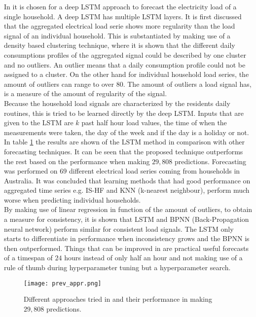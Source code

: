 In \cite{Kong2019} it is chosen for a deep LSTM approach to forecast the electricity load of a single household. A deep LSTM has multiple LSTM layers. It is first discussed that the aggregated electrical load serie shows more regularity than the load signal of an individual household.  This is substantiated by making use of a density based clustering technique, where it is shown that the different daily consumptions profiles of the aggregated signal could be described by one cluster and no outliers. An outlier means that a daily consumption profile could not be assigned to a cluster. On the other hand for individual household load series, the amount of outliers can range to over $ 80 $. The amount of outliers a load signal has, is a measure of the amount of regularity of the signal.\\
Because the household load signals are characterized by the residents daily routines, this is tried to be learned directly by the deep LSTM.
Inputs that are given to the LSTM are $ k $ past half hour load values, the time of when the measurements were taken, the day of the week and if the day is a holiday or not. In table \ref{tab:LSTM_lit_result} the results are shown of the LSTM method in comparison with other forecasting techniques. It can be seen that the proposed technique outperforms the rest based on the performance when making $ 29,808 $ predictions. Forecasting was performed on $ 69 $ different electrical load series coming from households in Australia. It was concluded that learning methods that had good performance on aggregated time series e.g. IS-HF and KNN (k-nearest neighbour), perform much worse when predicting individual households. \\
By making use of linear regression in function of the amount of outliers, to obtain a measure for consistency, it is shown that LSTM and BPNN (Back-Propagation neural network) perform similar for consistent load signals. The LSTM only starts to differentiate in performance when inconsistency grows and the BPNN is then outperformed. Things that can be improved in \cite{Kong2019} are practical useful forecasts of a timespan of $ 24 $ hours instead of only half an hour and not making use of a rule of thumb during hyperparameter tuning but a hyperparameter search.\\

\begin{figure}[h!]
	\centering
	\texttt{[image: prev\_appr.png]}
	\caption{Different approaches tried in \cite{Kong2019} and their performance in making $ 29,808 $ predictions.}
	\label{tab:LSTM_lit_result}
\end{figure}

